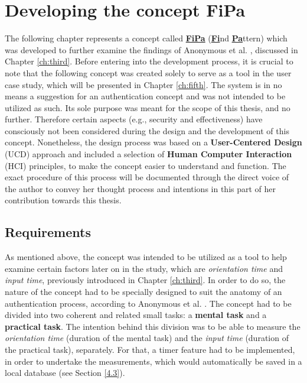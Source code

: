 
\chapter{Developing the concept FiPa}\label{ch:forth}
The following chapter represents a concept called \underline{\textbf{FiPa}} (\underline{\textbf{Fi}}nd \underline{\textbf{Pa}}ttern) which was developed to further examine the findings of Anonymous et al. \cite{anonymous}, discussed in Chapter \ref{ch:third}. Before entering into the development process, it is crucial to note that the following concept was created solely to serve as a tool in the user case study, which will be presented in Chapter \ref{ch:fifth}. The system is in no means a suggestion for an authentication concept and was not intended to be utilized as such. Its sole purpose was meant for the scope of this thesis, and no further. Therefore certain aspects (e.g., security and effectiveness) have consciously not been considered during the design and the development of this concept. Nonetheless, the design process was based on a  \textbf{User-Centered Design} (UCD) approach and included a selection of \textbf{Human Computer Interaction} (HCI) principles, to make the concept easier to understand and function. The exact procedure of this process will be documented through the direct voice of the author to convey her thought process and intentions in this part of her contribution towards this thesis. 

\section{Requirements} \label{4.1}
As mentioned above, the concept was intended to be utilized as a tool to help examine certain factors later on in the study, which are \textit{orientation time} and \textit{input time}, previously introduced in Chapter \ref{ch:third}. In order to do so, the nature of the concept had to be specially designed to suit the anatomy of an authentication process, according to Anonymous et al. \cite{anonymous}. The concept had to be divided into two coherent and related small tasks: a \textbf{mental task} and a \textbf{practical task}. The intention behind this division was to be able to measure the \textit{orientation time} (duration of the mental task) and the \textit{input time} (duration of the practical task), separately. For that, a timer feature had to be implemented, in order to undertake the measurements, which would automatically be saved in a local database (see Section \ref{4.3}).\\

